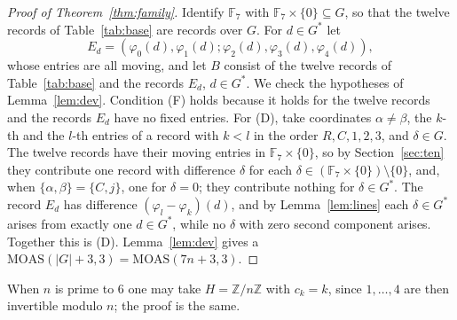 \documentclass[11pt]{amsart}
\theoremstyle{definition}\newtheorem{definition}[theorem]{Definition}
\theoremstyle{remark}\newtheorem{remark}[theorem]{Remark}
\newcommand{\MOAS}{\mathrm{MOAS}}
\begin{document}
\begin{proof}[Proof of Theorem~\ref{thm:family}]
Identify $\mathbb F_7$ with $\mathbb F_7\times\{0\}\subseteq G$, so that the twelve records of Table~\ref{tab:base} are
records over $G$. For $d\in G^*$ let
\[
E_d=(\varphi_0(d),\varphi_1(d);\varphi_2(d),\varphi_3(d),\varphi_4(d)),
\]
whose entries are all moving, and let $B$ consist of the twelve records of Table~\ref{tab:base} and the records $E_d$,
$d\in G^*$. We check the hypotheses of Lemma~\ref{lem:dev}. Condition (F) holds because it holds for the twelve
records and the records $E_d$ have no fixed entries. For (D), take coordinates $\alpha\ne\beta$, the $k$-th and the
$l$-th entries of a record with $k<l$ in the order $R,C,1,2,3$, and $\delta\in G$. The twelve records have their moving
entries in $\mathbb F_7\times\{0\}$, so by Section~\ref{sec:ten} they contribute one record with difference $\delta$
for each $\delta\in(\mathbb F_7\times\{0\})\setminus\{0\}$, and, when $\{\alpha,\beta\}=\{C,j\}$, one for $\delta=0$;
they contribute nothing for $\delta\in G^*$. The record $E_d$ has difference $(\varphi_l-\varphi_k)(d)$, and by
Lemma~\ref{lem:lines} each $\delta\in G^*$ arises from exactly one $d\in G^*$, while no $\delta$ with zero second
component arises. Together this is (D). Lemma~\ref{lem:dev} gives a $\MOAS(|G|+3,3)=\MOAS(7n+3,3)$.
\end{proof}

When $n$ is prime to $6$ one may take $H=\mathbb Z/n\mathbb Z$ with $c_k=k$, since $1,\dots,4$ are then invertible
modulo $n$; the proof is the same.
\end{document}
